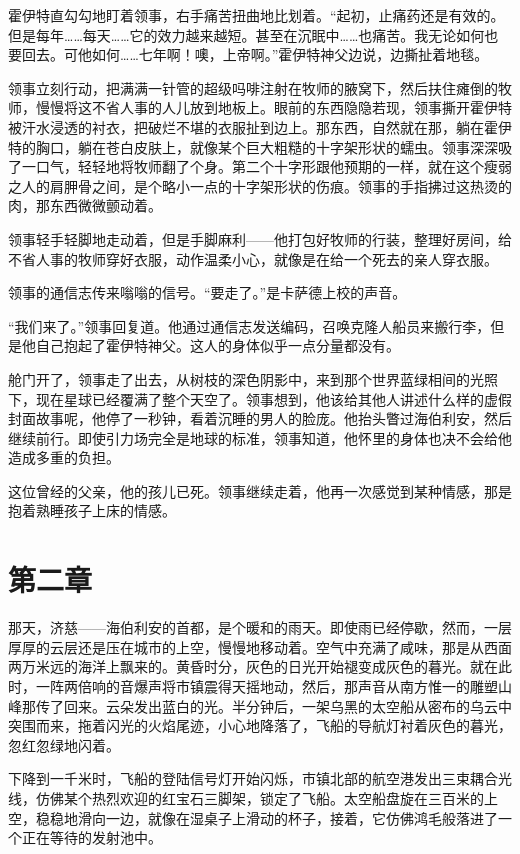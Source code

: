 \documentclass[AutoFakeBold=true]{book}
\begin{document}
霍伊特直勾勾地盯着领事，右手痛苦扭曲地比划着。``起初，止痛药还是有效的。但是每年……每天……它的效力越来越短。甚至在沉眠中……也痛苦。我无论如何也要回去。可他如何……七年啊！噢，上帝啊。''霍伊特神父边说，边撕扯着地毯。

领事立刻行动，把满满一针管的超级吗啡注射在牧师的腋窝下，然后扶住瘫倒的牧师，慢慢将这不省人事的人儿放到地板上。眼前的东西隐隐若现，领事撕开霍伊特被汗水浸透的衬衣，把破烂不堪的衣服扯到边上。那东西，自然就在那，躺在霍伊特的胸口，躺在苍白皮肤上，就像某个巨大粗糙的十字架形状的蠕虫。领事深深吸了一口气，轻轻地将牧师翻了个身。第二个十字形跟他预期的一样，就在这个瘦弱之人的肩胛骨之间，是个略小一点的十字架形状的伤痕。领事的手指拂过这热烫的肉，那东西微微颤动着。

领事轻手轻脚地走动着，但是手脚麻利——他打包好牧师的行装，整理好房间，给不省人事的牧师穿好衣服，动作温柔小心，就像是在给一个死去的亲人穿衣服。

领事的通信志传来嗡嗡的信号。``要走了。''是卡萨德上校的声音。

``我们来了。''领事回复道。他通过通信志发送编码，召唤克隆人船员来搬行李，但是他自己抱起了霍伊特神父。这人的身体似乎一点分量都没有。

舱门开了，领事走了出去，从树枝的深色阴影中，来到那个世界蓝绿相间的光照下，现在星球已经覆满了整个天空了。领事想到，他该给其他人讲述什么样的虚假封面故事呢，他停了一秒钟，看着沉睡的男人的脸庞。他抬头瞥过海伯利安，然后继续前行。即使引力场完全是地球的标准，领事知道，他怀里的身体也决不会给他造成多重的负担。

这位曾经的父亲，他的孩儿已死。领事继续走着，他再一次感觉到某种情感，那是抱着熟睡孩子上床的情感。

\chapter{第二章}

那天，济慈——海伯利安的首都，是个暖和的雨天。即使雨已经停歇，然而，一层厚厚的云层还是压在城市的上空，慢慢地移动着。空气中充满了咸味，那是从西面两万米远的海洋上飘来的。黄昏时分，灰色的日光开始褪变成灰色的暮光。就在此时，一阵两倍响的音爆声将市镇震得天摇地动，然后，那声音从南方惟一的雕塑山峰那传了回来。云朵发出蓝白的光。半分钟后，一架乌黑的太空船从密布的乌云中突围而来，拖着闪光的火焰尾迹，小心地降落了，飞船的导航灯衬着灰色的暮光，忽红忽绿地闪着。

下降到一千米时，飞船的登陆信号灯开始闪烁，市镇北部的航空港发出三束耦合光线，仿佛某个热烈欢迎的红宝石三脚架，锁定了飞船。太空船盘旋在三百米的上空，稳稳地滑向一边，就像在湿桌子上滑动的杯子，接着，它仿佛鸿毛般落进了一个正在等待的发射池中。
\end{document}
